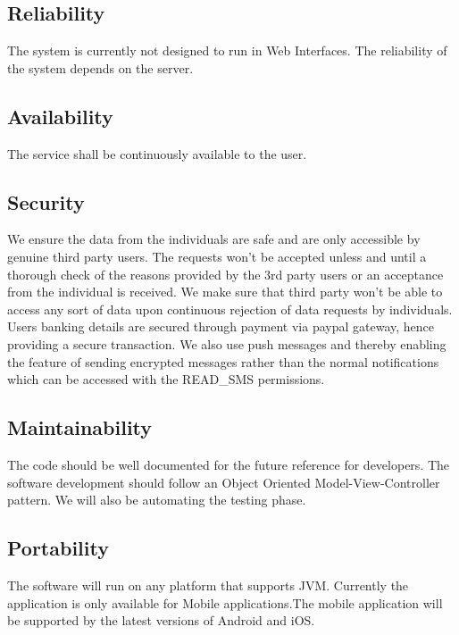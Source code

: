 \subsection{Reliability}
\qquad The system is currently not designed to run in Web Interfaces. The reliability of the system depends on the server.

\subsection{Availability}
\qquad The service shall be continuously available to the user.

\subsection{Security} 
\qquad We ensure the data from the individuals are safe and are only accessible by genuine third party users. 
The requests won’t be accepted unless and until a thorough check of the reasons provided by the 3rd party users or an acceptance from the individual is received. We make sure that third party won’t be able to access any sort of data upon continuous rejection of data requests by individuals. Users banking details are secured through payment via paypal gateway, hence providing a secure transaction. We also use  push messages and thereby enabling the feature of sending encrypted messages rather than the normal notifications which can be accessed with the READ\_SMS permissions.

\subsection{Maintainability}
\qquad The code should be well documented for the future reference for developers. The software development should follow an Object Oriented Model-View-Controller pattern. We will also be automating the testing phase.

\subsection{Portability}
\qquad The software will run on any platform that supports JVM. Currently the application is only available for Mobile applications.The mobile application will be supported by the latest versions of Android and iOS.